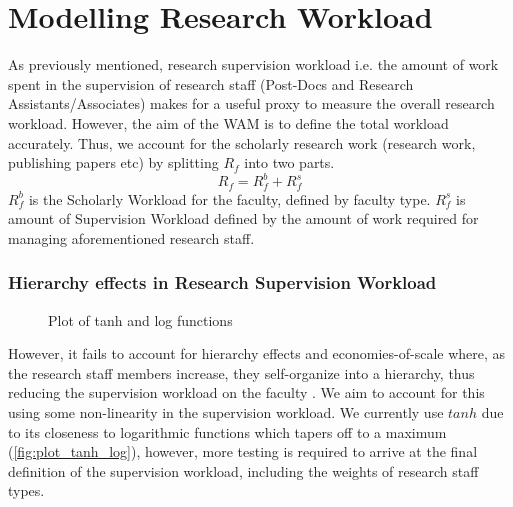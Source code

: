 \section{Modelling Research Workload}
As previously mentioned, research supervision workload i.e. the amount of work spent in the supervision of research staff (Post-Docs and Research Assistants/Associates) \parencite{rohan2017} makes for a useful proxy to measure the overall research workload. However, the aim of the WAM is to define the total workload accurately. Thus, we account for the scholarly research work (research work, publishing papers etc) by splitting \(R_f\) into two parts.
\[R_f = R^b_f + R^s_f\]
\(R^b_f\) is the Scholarly Workload for the faculty, defined by faculty type. \(R^s_f\) is amount of Supervision Workload defined by the amount of work required for managing aforementioned research staff.
\subsubsection{Hierarchy effects in Research Supervision Workload}
\begin{figure}[H]
    \centering
    \caption{Plot of tanh and log functions}
    \label{fig:plot_tanh_log}
\end{figure}
However, it fails to account for hierarchy effects and economies-of-scale where, as the research staff members increase, they self-organize into a hierarchy, thus reducing the supervision workload on the faculty \parencite{WANG2015197,wellman1997electronic}. We aim to account for this using some non-linearity in the supervision workload. We currently use \(tanh\) due to its closeness to logarithmic functions which tapers off to a maximum (\autoref{fig:plot_tanh_log}), however, more testing is required to arrive at the final definition of the supervision workload, including the weights of research staff types.

